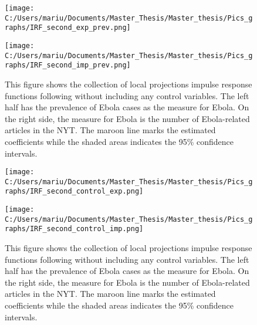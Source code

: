 \documentclass{article}
\begin{document}
\begin{figure}[!ht] 
\begin{minipage}[t]{0.5\linewidth}\vspace{0pt} 
\texttt{[image: C:/Users/mariu/Documents/Master\_Thesis/Master\_thesis/Pics\_graphs/IRF\_second\_exp\_prev.png]}\\
\end{minipage}\hfill%
\begin{minipage}[t]{0.5\linewidth}\vspace{0pt} 
\texttt{[image: C:/Users/mariu/Documents/Master\_Thesis/Master\_thesis/Pics\_graphs/IRF\_second\_imp\_prev.png]}\\
\end{minipage}\hfill%
\caption{This figure shows the collection of local projections impulse response functions following \cite{jorda2005estimation} without including any control variables. The left half has the prevalence of Ebola cases as the measure for Ebola. On the right side, the measure for Ebola is the number of Ebola-related articles in the NYT. The maroon line marks the estimated coefficients while the shaded areas indicates the 95\% confidence intervals.}
\label{Second Stage IRF - no controls}
\end{figure}

\begin{figure}[!ht] 
\begin{minipage}[t]{0.5\linewidth}\vspace{0pt} 
\texttt{[image: C:/Users/mariu/Documents/Master\_Thesis/Master\_thesis/Pics\_graphs/IRF\_second\_control\_exp.png]}\\
\end{minipage}\hfill%
\begin{minipage}[t]{0.5\linewidth}\vspace{0pt} 
\texttt{[image: C:/Users/mariu/Documents/Master\_Thesis/Master\_thesis/Pics\_graphs/IRF\_second\_control\_imp.png]}\\
\end{minipage}\hfill%
\caption{This figure shows the collection of local projections impulse response functions following \cite{jorda2005estimation} without including any control variables. The left half has the prevalence of Ebola cases as the measure for Ebola. On the right side, the measure for Ebola is the number of Ebola-related articles in the NYT. The maroon line marks the estimated coefficients while the shaded areas indicates the 95\% confidence intervals.}
\label{Second Stage IRF - controls}
\end{figure}
\end{document}
